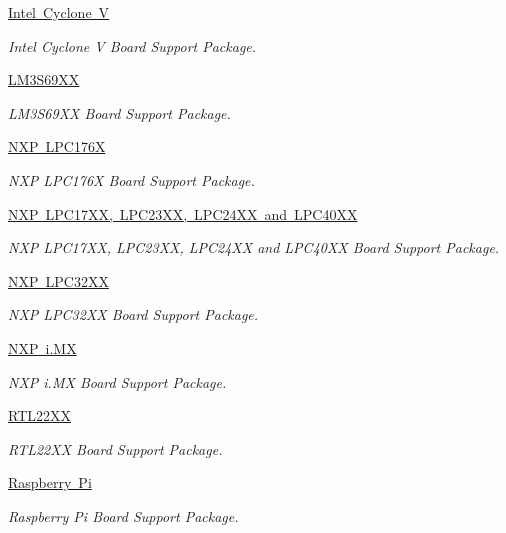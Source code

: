 \begin{DoxyCompactItemize}
\mbox{\hyperlink{group__RTEMSBSPsARMCycV}{Intel Cyclone V}}
\begin{DoxyCompactList}\small\item\em Intel Cyclone V Board Support Package. \end{DoxyCompactList}\item 
\mbox{\hyperlink{group__RTEMSBSPsARMLM3S69XX}{L\+M3\+S69\+XX}}
\begin{DoxyCompactList}\small\item\em L\+M3\+S69\+XX Board Support Package. \end{DoxyCompactList}\item 
\mbox{\hyperlink{group__RTEMSBSPsARMLPC176X}{N\+X\+P L\+P\+C176X}}
\begin{DoxyCompactList}\small\item\em N\+XP L\+P\+C176X Board Support Package. \end{DoxyCompactList}\item 
\mbox{\hyperlink{group__RTEMSBSPsARMLPC24XX}{N\+X\+P L\+P\+C17\+X\+X, L\+P\+C23\+X\+X, L\+P\+C24\+X\+X and L\+P\+C40\+XX}}
\begin{DoxyCompactList}\small\item\em N\+XP L\+P\+C17\+XX, L\+P\+C23\+XX, L\+P\+C24\+XX and L\+P\+C40\+XX Board Support Package. \end{DoxyCompactList}\item 
\mbox{\hyperlink{group__RTEMSBSPsARMLPC32XX}{N\+X\+P L\+P\+C32\+XX}}
\begin{DoxyCompactList}\small\item\em N\+XP L\+P\+C32\+XX Board Support Package. \end{DoxyCompactList}\item 
\mbox{\hyperlink{group__RTEMSBSPsARMimx}{N\+X\+P i.\+MX}}
\begin{DoxyCompactList}\small\item\em N\+XP i.\+MX Board Support Package. \end{DoxyCompactList}\item 
\mbox{\hyperlink{group__RTEMSBSPsARMRTL22XX}{R\+T\+L22\+XX}}
\begin{DoxyCompactList}\small\item\em R\+T\+L22\+XX Board Support Package. \end{DoxyCompactList}\item 
\mbox{\hyperlink{group__RTEMSBSPsARMRaspberryPi}{Raspberry Pi}}
\begin{DoxyCompactList}\small\item\em Raspberry Pi Board Support Package. \end{DoxyCompactList}\item 

\end{DoxyCompactItemize}
